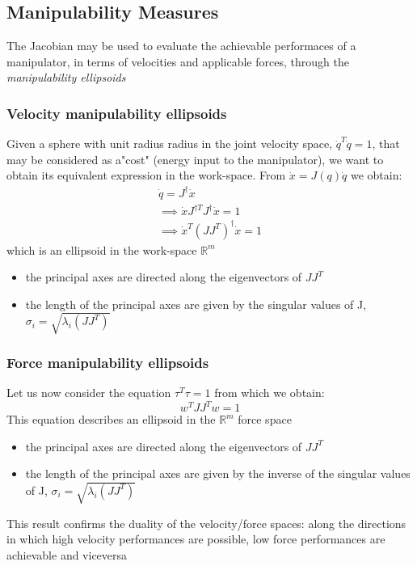\documentclass{book}
\begin{document}
\subsection{Manipulability Measures}
The Jacobian may be used to evaluate the achievable performaces of a manipulator, in terms of velocities and applicable forces, through the \emph{manipulability ellipsoids}
\subsubsection{Velocity manipulability ellipsoids}
Given a sphere with unit radius radius in the joint velocity space, $\dot{q}^T\dot{q}=1$, that may be considered as a"cost" (energy input to the manipulator), we want to obtain its equivalent expression in the work-space. From $\dot{x}=J(q)\dot{q}$ we obtain:
\begin{gather*}
    \dot{q}=J^\dagger \dot{x}\\
    \implies \dot{x} J^{\dagger T}J^\dagger\dot{x}=1\\
    \implies \dot{x}^T(JJ^T)^\dagger\dot{x}=1
\end{gather*}
which is an ellipsoid in the work-space $\mathbb{R}^m$
\begin{itemize}
    \item the principal axes are directed along the eigenvectors of $JJ^T$
    \item the length of the principal axes are given by the singular values of J, $\sigma_i=\sqrt{\lambda_i(JJ^T)}$
\end{itemize}
\subsubsection{Force manipulability ellipsoids}
Let us now consider the equation $\tau^T\tau=1$ from which we obtain:
\[
    w^TJJ^Tw=1
\]
This equation describes an ellipsoid in the $\mathbb{R}^m$ force space
\begin{itemize}
    \item the principal axes are directed along the eigenvectors of $JJ^T$
    \item the length of the principal axes are given by the inverse of the singular values of J, $\sigma_i=\sqrt{\lambda_i(JJ^T)}$
\end{itemize}
This result confirms the duality of the velocity/force spaces: along the directions in which high velocity performances are possible, low force performances are achievable and viceversa
\end{document}
